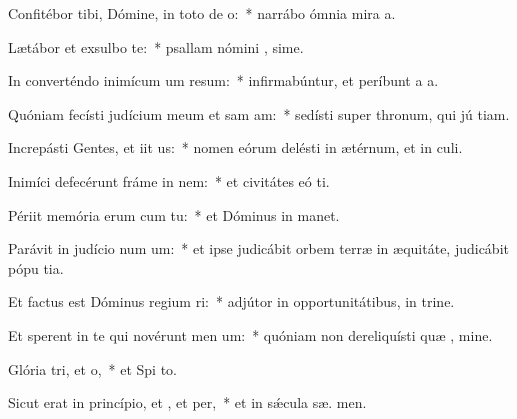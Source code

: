 \item Confitébor tibi, Dómine, in toto de o:~* narrábo ómnia mira a.
\item Lætábor et exsulbo  te:~* psallam nómini , sime.
\item In converténdo inimícum um resum:~* infirmabúntur, et períbunt a  a.
\item Quóniam fecísti judícium meum et sam am:~* sedísti super thronum, qui jú tiam.
\item Increpásti Gentes, et iit us:~* nomen eórum delésti in ætérnum, et in  culi.
\item Inimíci defecérunt fráme in nem:~* et civitátes eó ti.
\item Périit memória erum cum tu:~* et Dóminus in  manet.
\item Parávit in judício num um:~* et ipse judicábit orbem terræ in æquitáte, judicábit pópu  tia.
\item Et factus est Dóminus regium ri:~* adjútor in opportunitátibus, in trine.
\item Et sperent in te qui novérunt men um:~* quóniam non dereliquísti quæ , mine.
\item Glória tri, et o,~* et Spi to.
\item Sicut erat in princípio, et , et per,~* et in sǽcula sæ. men.
